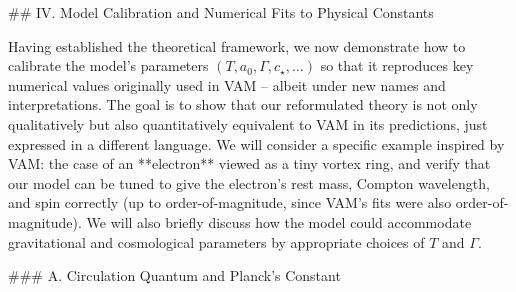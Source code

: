 \documentclass[12pt]{article}
\begin{document}
## IV. Model Calibration and Numerical Fits to Physical Constants

Having established the theoretical framework, we now demonstrate how to calibrate the model’s parameters $(T, a_0, \Gamma, c_\star, \ldots)$ so that it reproduces key numerical values originally used in VAM – albeit under new names and interpretations. The goal is to show that our reformulated theory is not only qualitatively but also quantitatively equivalent to VAM in its predictions, just expressed in a different language. We will consider a specific example inspired by VAM: the case of an **electron** viewed as a tiny vortex ring, and verify that our model can be tuned to give the electron’s rest mass, Compton wavelength, and spin correctly (up to order-of-magnitude, since VAM’s fits were also order-of-magnitude). We will also briefly discuss how the model could accommodate gravitational and cosmological parameters by appropriate choices of $T$ and $\Gamma$. 

### A. Circulation Quantum and Planck’s Constant
\end{document}
